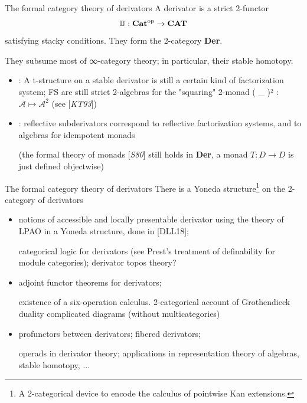 \documentclass{beamer}
\def\lnk#1{\href{#1}{\faFilePdfO}}
\begin{document}
\begin{frame}{The formal category theory of derivators}
  A \alert{derivator} is a strict 2-functor
  \[\mathbb{D} : {\bf Cat}^\text{op} \to {\bf CAT} \]
  satisfying stacky conditions. They form the 2-category \textbf{Der}.

  They subsume most of ∞-category theory; in particular, their stable homotopy.
  \begin{itemize}
    \item<2-> [{[\alert{LV17}\lnk{https://www.sciencedirect.com/science/article/abs/pii/S0021869320300296}]}] : A t-structure on a stable derivator is still a certain kind of factorization system; FS are still \alert{strict 2-algebras} for the "squaring" 2-monad ( \_ )² : $\mathcal A \mapsto \mathcal A^2$ (see [\emph{KT93}])

    \item<3->  [{[\alert{Lor18}\lnk{https://arxiv.org/abs/1802.08193}]}] : reflective subderivators correspond to reflective factorization systems, and to algebras for idempotent monads

    (the \alert{formal theory of monads} [\emph{S80}] still holds in \textbf{Der}, a monad $T : D \to D$ is just defined objectwise)
  \end{itemize}
\end{frame}
%
\begin{frame}{The formal category theory of derivators}
  There is a \alert{Yoneda structure}\footnote{A 2-categorical device to encode the calculus of pointwise Kan extensions.} on the 2-category of derivators
\begin{itemize}
\item<2-> notions of \alert{accessible} and \alert{locally presentable} derivator using the theory of LPAO in a Yoneda structure, done in [\alert{DLL18}\lnk{https://arxiv.org/abs/1804.08710}]; 

{\footnotesize\color{gray!60} categorical logic for derivators (see Prest's treatment of \alert{definability} for module categories); derivator \alert{topos theory}?}
\item<3-> \alert{adjoint functor theorem}s for derivators; 

{\footnotesize\color{gray!60} existence of a \alert{six-operation} calculus. 2-categorical account of Grothendieck duality complicated diagrams (without multicategories)}
\item<4-> \alert{profunctors} between derivators; fibered derivators; 

{\footnotesize\color{gray!60} \alert{operads} in derivator theory; applications in representation theory of algebras, stable homotopy, ...}
\end{itemize}
\end{frame}
\end{document}
